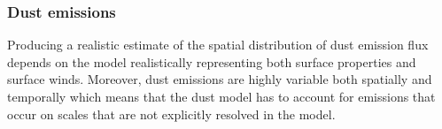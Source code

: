 


\subsubsection{Dust emissions}\label{sec:dust_emission_modelling}
Producing a realistic estimate of the spatial distribution of dust emission flux depends on the model realistically representing both surface properties and surface winds. Moreover, dust emissions are highly variable both spatially and temporally which means that the dust model has to account for emissions that occur on scales that are not explicitly resolved in the model.        


